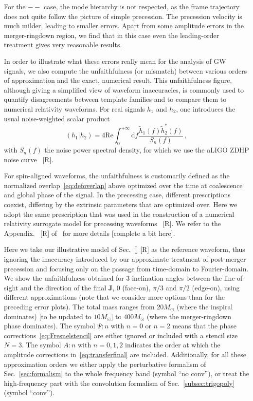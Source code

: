 \documentclass[aps,showpacs,twocolumn,
prd,superscriptaddress,nofootinbib]{revtex4-1}
\newcommand{\be}{\begin{equation}}
\newcommand{\ee}{\end{equation}}
\newcommand\ud{{\mathrm{d}}}
\newcommand{\Msol}{M_{\odot}}
\newcommand{\SM}[1]{{\color{Red} #1}}
\begin{document}
For the $--$ case, the mode hierarchy is not respected, as the frame trajectory does not quite follow the picture of simple precession. The precession velocity is much milder, leading to smaller errors. Apart from some amplitude errors in the merger-ringdown region, we find that in this case even the leading-order treatment gives very reasonable results.

In order to illustrate what these errors really mean for the analysis of GW signals, we also compute the unfaithfulness (or mismatch) between various orders of approximation and the exact, numerical result. This unfaithfulness figure, although giving a simplified view of waveform inaccuracies, is commonly used to quantify disagreements between template families and to compare them to numerical relativity waveforms. For real signals $h_{1}$ and $h_{2}$, one introduces the usual noise-weighted scalar product
\be\label{eq:defoverlap}
	\left( h_{1} | h_{2} \right) = 4\text{Re} \int_{0}^{+\infty} \ud f \frac{\tilde{h}_{1}(f) \tilde{h}_{2}^{*}(f)}{S_{n}(f)} \,,
\ee
with $S_{n}(f)$ the noise power spectral density, for which we use the aLIGO ZDHP noise curve~\cite{} \SM{[R]}.

For spin-aligned waveforms, the unfaithfulness is customarily defined as the normalized overlap~\eqref{eq:defoverlap} above optimized over the time at coalescence and global phase of the signal. In the precessing case, different prescriptions coexist, differing by the extrinsic parameters that are optimized over. Here we adopt the same prescription that was used in the construction of a numerical relativity surrogate model for precessing waveforms~\cite{} \SM{[R]}. We refer to the Appendix.~\SM{[R]} of~\cite{} for more details \SM{[complete a bit here]}.

Here we take our illustrative model of Sec.~\ref{} \SM{[R]} as the reference waveform, thus ignoring the inaccuracy introduced by our approximate treatment of post-merger precession and focusing only on the passage from time-domain to Fourier-domain. We show the unfaithfulness obtained for 3 inclination angles between the line-of-sight and the direction of the final $\bm{J}$, $0$ (face-on), $\pi/3$ and $\pi/2$ (edge-on), using different approximations (note that we consider more options than for the preceding error plots). The total mass ranges from $20\Msol$ (where the inspiral dominates) \SM{[to be updated to $10 \Msol$]} to $400\Msol$ (where the merger-ringdown phase dominates). The symbol $\Psi:n$ with $n=0$ or $n=2$ means that the phase corrections~\eqref{eq:Fresnelstencil} are either ignored or included with a stencil size $N=3$. The symbol $A:n$ with $n=0,1,2$ indicates the order at which the amplitude corrections in~\eqref{eq:transferfinal} are included. Additionally, for all these approximation orders we either apply the perturbative formalism of Sec.~\ref{sec:formalism} to the whole frequency band (symbol ``no conv''), or treat the high-frequency part with the convolution formalism of Sec.~\ref{subsec:trigopoly} (symbol ``conv''). 
\end{document}
